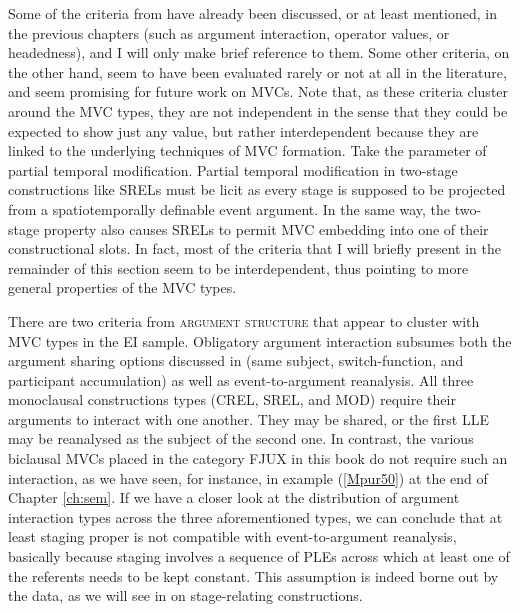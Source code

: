 Some of the criteria from  have already been discussed, or at least mentioned, in the previous chapters (such as argument interaction, operator values, or headedness), and I will only make brief reference to them. Some other criteria, on the other hand, seem to have been evaluated rarely or not at all in the literature, and seem promising for future work on MVCs. Note that, as these criteria cluster around the MVC types, they are not independent in the sense that they could be expected to show just any value, but rather interdependent because they are linked to the underlying techniques of MVC formation. Take the parameter of partial temporal modification. Partial temporal modification in two-stage constructions like SRELs must be licit as every stage is supposed to be projected from a spatiotemporally definable event argument. In the same way, the two-stage property also causes SRELs to permit MVC embedding into one of their constructional slots. In fact, most of the criteria that I will briefly present in the remainder of this section seem to be interdependent, thus pointing to more general properties of the MVC types.

There are two criteria from \textsc{argument structure} that appear to cluster with MVC types in the EI sample. Obligatory argument interaction subsumes both the argument sharing options discussed in  (same subject, switch-function, and participant accumulation) as well as event-to-argument reanalysis. All three monoclausal constructions types (CREL, SREL, and MOD) require their arguments to interact with one another. They may be shared, or the first LLE may be reanalysed as the subject of the second one. In contrast, the various biclausal MVCs placed in the category FJUX in this book do not require such an interaction, as we have seen, for instance, in example (\ref{Mpur50}) at the end of Chapter \ref{ch:sem}. If we have a closer look at the distribution of argument interaction types across the three aforementioned types, we can conclude that at least staging proper is not compatible with event-to-argument reanalysis, basically because staging involves a sequence of PLEs across which at least one of the referents needs to be kept constant. This assumption is indeed borne out by the data, as we will see in  on stage-relating constructions.

